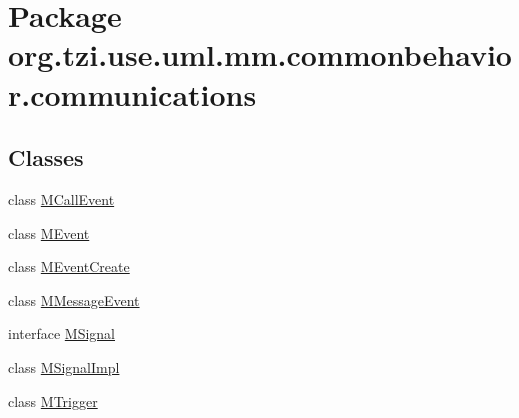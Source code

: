 \hypertarget{namespaceorg_1_1tzi_1_1use_1_1uml_1_1mm_1_1commonbehavior_1_1communications}{\section{Package org.\-tzi.\-use.\-uml.\-mm.\-commonbehavior.\-communications}
\label{namespaceorg_1_1tzi_1_1use_1_1uml_1_1mm_1_1commonbehavior_1_1communications}
}
\subsection*{Classes}
\begin{DoxyCompactItemize}
\item 
class \hyperlink{classorg_1_1tzi_1_1use_1_1uml_1_1mm_1_1commonbehavior_1_1communications_1_1_m_call_event}{M\-Call\-Event}
\item 
class \hyperlink{classorg_1_1tzi_1_1use_1_1uml_1_1mm_1_1commonbehavior_1_1communications_1_1_m_event}{M\-Event}
\item 
class \hyperlink{classorg_1_1tzi_1_1use_1_1uml_1_1mm_1_1commonbehavior_1_1communications_1_1_m_event_create}{M\-Event\-Create}
\item 
class \hyperlink{classorg_1_1tzi_1_1use_1_1uml_1_1mm_1_1commonbehavior_1_1communications_1_1_m_message_event}{M\-Message\-Event}
\item 
interface \hyperlink{interfaceorg_1_1tzi_1_1use_1_1uml_1_1mm_1_1commonbehavior_1_1communications_1_1_m_signal}{M\-Signal}
\item 
class \hyperlink{classorg_1_1tzi_1_1use_1_1uml_1_1mm_1_1commonbehavior_1_1communications_1_1_m_signal_impl}{M\-Signal\-Impl}
\item 
class \hyperlink{classorg_1_1tzi_1_1use_1_1uml_1_1mm_1_1commonbehavior_1_1communications_1_1_m_trigger}{M\-Trigger}
\end{DoxyCompactItemize}
